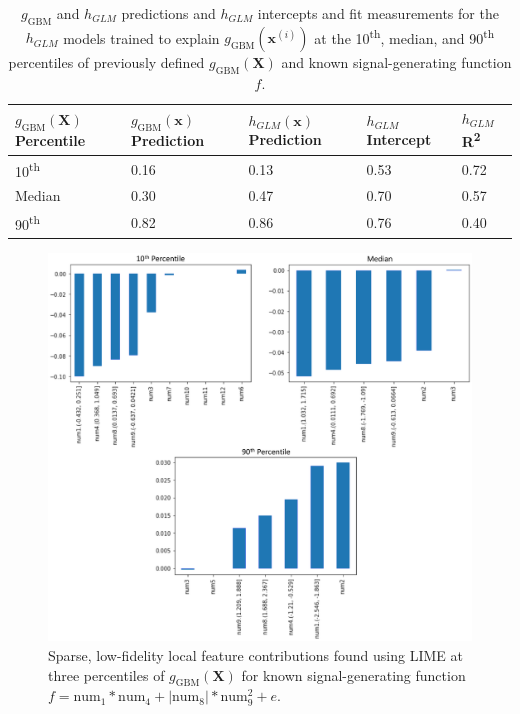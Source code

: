 \documentclass[11pt]{asaproc}
\begin{document}
\begin{table}[ht]
	\centering
	\caption{$g_{\text{GBM}}$ and $h_{GLM}$ predictions and $h_{GLM}$ intercepts and fit measurements for the $h_{GLM}$ models trained to explain $g_{\text{GBM}}(\mathbf{x}^{(i)})$ at the 10\textsuperscript{th}, median, and 90\textsuperscript{th} percentiles of previously defined $g_{\text{GBM}}(\mathbf{X})$ and known signal-generating function $f$.} 
	\begin{tabular}{ | p{1.7cm} | p{1.7cm} | p{1.7cm} | p{1.5cm}| p{1cm} | }
	\hline
	$g_{\text{GBM}}(\mathbf{X})$ Percentile & $g_{\text{GBM}}(\mathbf{x})$ Prediction & $h_{GLM}(\mathbf{x})$ Prediction & $h_{GLM}$ Intercept & $h_{GLM}$ R\textsuperscript{2} \\ 
	\hline
	10\textsuperscript{th} & 0.16 & 0.13 & 0.53 & 0.72\\
	\hline	
	Median & 0.30 & 0.47 & 0.70 & 0.57\\
	\hline	
	90\textsuperscript{th} & 0.82 & 0.86 & 0.76 & 0.40\\
	\hline
	\end{tabular}
	\label{tab:lime}
\end{table}	

\begin{figure}[htb]
	\begin{center}
		\includegraphics[scale=0.6]{img/figure_5.eps}
		\caption{Sparse, low-fidelity local feature contributions found using LIME at three percentiles of $g_{\text{GBM}}(\mathbf{X})$ for known signal-generating function $f = \text{num} _1 * \text{num}_4 + |\text{num}_8| * \text{num}_9^2 + e$.}
		\label{fig:lime}
	\end{center}
\end{figure}
\end{document}
